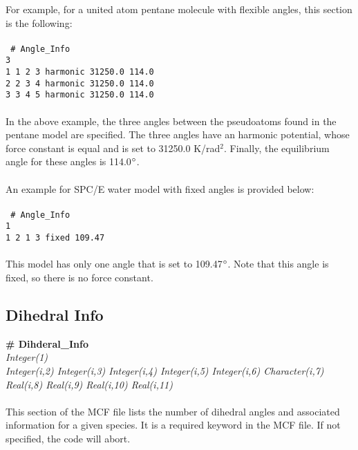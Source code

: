 {{{\begin{itemize}
\end{itemize}
For example, for a united atom pentane molecule with flexible angles, this section is the following: \\ \\
%
\texttt{
\# Angle\_Info \\
3 \\
1    1    2    3    harmonic     31250.0    114.0\\
2    2    3    4    harmonic     31250.0    114.0\\
3    3    4    5    harmonic     31250.0    114.0\\
} \\ 
%
In the above example, the three angles between the pseudoatoms found in the pentane model are specified.
The three angles have an harmonic potential, whose force constant is equal and is set to 31250.0 K/rad$^2$.
Finally, the equilibrium angle for these angles is 114.0$\degree$. \\ \\
%
An example for SPC/E water model with fixed angles is provided below: \\ \\
%
\texttt{
\# Angle\_Info \\
1 \\
1    2    1    3   fixed  109.47 \\
} \\
This model has only one angle that is set to 109.47$\degree$. Note that this angle is fixed, so there is no
force constant. 
%
\subsection{Dihedral Info}\label{sec:Get_Dihedral_Info}
%
{\bf \# Dihderal\_Info} \\ 
%
{\it Integer(1)} \\
%
{\it Integer(i,2) Integer(i,3) Integer(i,4) Integer(i,5) Integer(i,6)
  Character(i,7) Real(i,8) Real(i,9) Real(i,10) Real(i,11)} \\ \\
%
This section of the MCF file lists the number of dihedral angles and 
associated information for a given species. It is a required keyword in the MCF file. 
If not specified, the code
will abort.  

}}}
